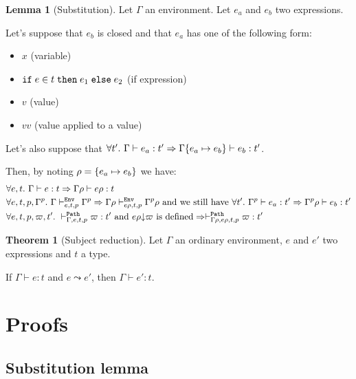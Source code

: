 \documentclass[a4paper]{article}
\theoremstyle{definition}
\newtheorem{theorem}{Theorem}
\newtheorem{lemma}{Lemma}
\begin{document}
        \begin{lemma}[Substitution]
          Let $\Gamma$ an environment. Let $e_a$ and $e_b$ two expressions.

          Let's suppose that $e_b$ is closed and that $e_a$ has one of the following form:
          \begin{itemize}
            \item $x$ (variable)
            \item $\ite e t {e_1} {e_2}$ (if expression)
            \item $v$ (value)
            \item $v v$ (value applied to a value)
          \end{itemize}
          Let's also suppose that $\forall t'.\ \Gamma \vdash e_a : t' \Rightarrow \Gamma\subst {e_a} {e_b} \vdash e_b:t'$.
          
          Then, by noting $\rho = \subst {e_a} {e_b}$ we have:
          \begin{align*}
            &\forall e,t.\ \Gamma \vdash e:t \Rightarrow \Gamma\rho \vdash e\rho:t\\
            &\forall e,t,p,\Gamma^p.\ \Gamma \evdash p {e} {t} \Gamma^p \Rightarrow \Gamma\rho \evdash p {e\rho} {t} {\Gamma^p}\rho
            \text{ and we still have } \forall t'.\ \Gamma^p \vdash e_a : t' \Rightarrow \Gamma^p\rho \vdash e_b:t'\\
            &\forall e,t,p,\varpi,t'.\ \pvdash \Gamma p e t \varpi:t' \text{ and }\occ {e\rho} \varpi\text{ is defined} \Rightarrow \pvdash {\Gamma\rho} p {e\rho} t \varpi:t'
          \end{align*}
        \end{lemma}

        \begin{theorem}[Subject reduction]
          Let $\Gamma$ an ordinary environment, $e$ and $e'$ two expressions and $t$ a type.

          If $\Gamma\vdash e:t$ and $e\leadsto e'$, then $\Gamma\vdash e':t$.
        \end{theorem}

        \section{Proofs}

        \subsection{Substitution lemma}
\end{document}
